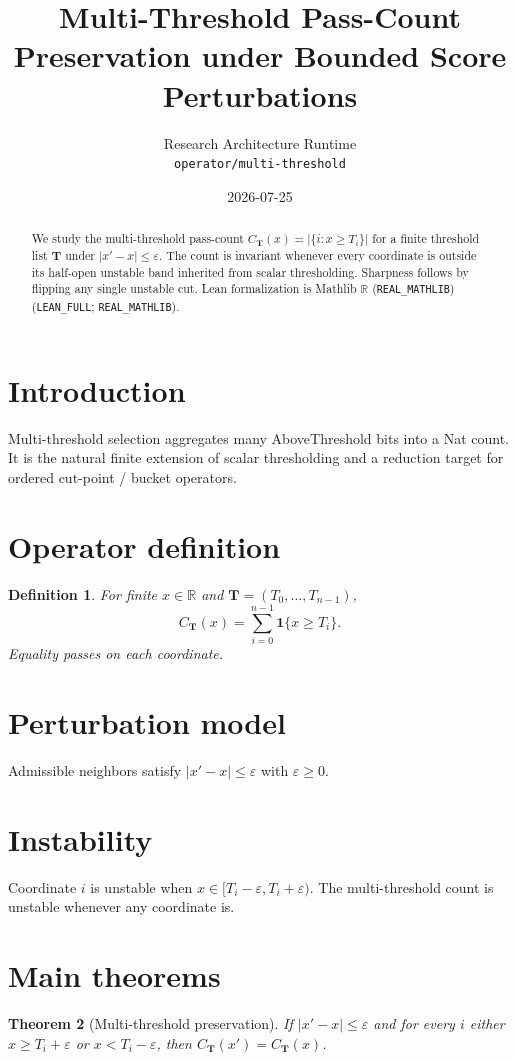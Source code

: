 \documentclass[11pt]{article}
\title{Multi-Threshold Pass-Count Preservation under Bounded Score Perturbations}
\author{Research Architecture Runtime \\ \texttt{operator/multi-threshold}}
\date{2026-07-25}
\newtheorem{theorem}{Theorem}
\newtheorem{definition}[theorem]{Definition}
\begin{document}
\maketitle

\begin{abstract}
We study the multi-threshold pass-count
\(C_{\mathbf{T}}(x)=\lvert\{i:x\ge T_i\}\rvert\) for a finite threshold list
\(\mathbf{T}\) under \(\lvert x'-x\rvert\le\varepsilon\).
The count is invariant whenever every coordinate is outside its half-open
unstable band inherited from scalar thresholding.
Sharpness follows by flipping any single unstable cut.
Lean formalization is Mathlib $\mathbb{R}$ (\texttt{REAL\_MATHLIB})
(\texttt{LEAN\_FULL}; \texttt{REAL\_MATHLIB}).
\end{abstract}

\section{Introduction}
Multi-threshold selection aggregates many AboveThreshold bits into a Nat count.
It is the natural finite extension of scalar thresholding and a reduction target
for ordered cut-point / bucket operators.

\section{Operator definition}
\begin{definition}
For finite \(x\in\mathbb{R}\) and \(\mathbf{T}=(T_0,\ldots,T_{n-1})\),
\[
C_{\mathbf{T}}(x)=\sum_{i=0}^{n-1}\mathbf{1}\{x\ge T_i\}.
\]
Equality passes on each coordinate.
\end{definition}

\section{Perturbation model}
Admissible neighbors satisfy \(\lvert x'-x\rvert\le\varepsilon\) with \(\varepsilon\ge 0\).

\section{Instability}
Coordinate \(i\) is unstable when \(x\in[T_i-\varepsilon,T_i+\varepsilon)\).
The multi-threshold count is unstable whenever any coordinate is.

\section{Main theorems}
\begin{theorem}[Multi-threshold preservation]\label{thm:main}
If \(\lvert x'-x\rvert\le\varepsilon\) and for every \(i\) either
\(x\ge T_i+\varepsilon\) or \(x<T_i-\varepsilon\), then
\(C_{\mathbf{T}}(x')=C_{\mathbf{T}}(x)\).
\end{theorem}
\end{document}
